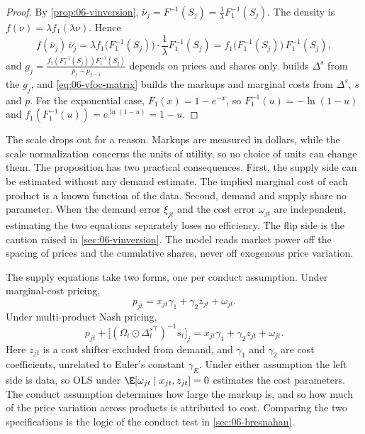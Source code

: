 \begin{proof}
By \cref{prop:06-vinversion}, $\bar\nu_j = F^{-1}(S_j) = \frac{1}{\lambda}F_1^{-1}(S_j)$. The density is
$f(\nu) = \lambda f_1(\lambda\nu)$. Hence
\begin{equation*}
  f(\bar\nu_j)\,\bar\nu_j = \lambda f_1\big(F_1^{-1}(S_j)\big)\cdot\frac{1}{\lambda}F_1^{-1}(S_j)
  = f_1\big(F_1^{-1}(S_j)\big)\,F_1^{-1}(S_j),
\end{equation*}
and $g_j = \frac{f_1(F_1^{-1}(S_j))F_1^{-1}(S_j)}{p_j - p_{j-1}}$ depends on prices and shares only.
 builds $\Delta^s$ from the $g_j$, and \eqref{eq:06-vfoc-matrix} builds the markups and
marginal costs from $\Delta^s$, $s$ and $p$. For the exponential case, $F_1(x) = 1 - e^{-x}$, so
$F_1^{-1}(u) = -\ln(1 - u)$ and $f_1(F_1^{-1}(u)) = e^{\ln(1-u)} = 1 - u$.
\end{proof}

The scale drops out for a reason. Markups are measured in dollars, while the scale normalization concerns
the units of utility, so no choice of units can change them. The proposition has two practical
consequences. First, the supply side can be estimated without any demand estimate. The implied marginal
cost of each product is a known function of the data. Second, demand and supply share no parameter. When
the demand error $\xi_{jt}$ and the cost error $\omega_{jt}$ are independent, estimating the two equations
separately loses no efficiency. The flip side is the caution raised in \cref{sec:06-vinversion}. The
model reads market power off the spacing of prices and the cumulative shares, never off exogenous price
variation.

The supply equations take two forms, one per conduct assumption. Under marginal-cost pricing,
\begin{equation}\label{eq:06-vsupply-mc}
  p_{jt} = x_{jt}\gamma_1 + \gamma_2 z_{jt} + \omega_{jt} .
\end{equation}
Under multi-product Nash pricing,
\begin{equation}\label{eq:06-vsupply-nash}
  p_{jt} + \big[(\Omega_t \odot \Delta_t^{s\top})^{-1}s_t\big]_j = x_{jt}\gamma_1 + \gamma_2 z_{jt} + \omega_{jt} .
\end{equation}
Here $z_{jt}$ is a cost shifter excluded from demand, and $\gamma_1$ and $\gamma_2$ are cost coefficients,
unrelated to Euler's constant $\gamma_E$. Under either assumption the left side is data, so OLS under
$\E[\omega_{jt} \mid x_{jt}, z_{jt}] = 0$ estimates the cost parameters. The conduct assumption determines how
large the markup is, and so how much of the price variation across products is attributed to cost.
Comparing the two specifications is the logic of the conduct test in \cref{sec:06-bresnahan}.

